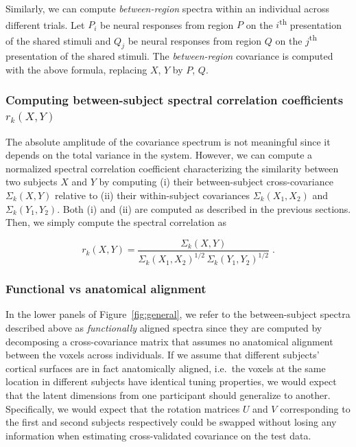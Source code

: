 \documentclass[10pt]{article}
\begin{document}
Similarly, we can compute \emph{between-region} spectra within an individual across different trials. Let \(P_i\) be neural responses from region \(P\) on the \(i\)\textsuperscript{th} presentation of the shared stimuli and \(Q_j\) be neural responses from region \(Q\) on the \(j\)\textsuperscript{th} presentation of the shared stimuli. The \emph{between-region} covariance is computed with the above formula, replacing \(X\), \(Y\) by \(P\), \(Q\).

\subsubsection{\texorpdfstring{Computing between-subject spectral correlation coefficients \(r_k(X, Y)\)}{Computing between-subject spectral correlation coefficients r\_k(X, Y)}}\label{computing-between-subject-spectral-correlation-coefficients-r_kx-y}

The absolute amplitude of the covariance spectrum is not meaningful since it depends on the total variance in the system. However, we can compute a normalized spectral correlation coefficient characterizing the similarity between two subjects \(X\) and \(Y\) by computing (i) their between-subject cross-covariance \(\Sigma_k(X, Y)\) relative to (ii) their within-subject covariances \(\Sigma_k(X_1, X_2)\) and \(\Sigma_k(Y_1, Y_2)\). Both (i) and (ii) are computed as described in the previous sections. Then, we simply compute the spectral correlation as

\[
    r_k(X, Y) = \frac{\Sigma_k(X, Y)}{\Sigma_k(X_1, X_2)^{1/2}\, \Sigma_k(Y_1, Y_2)^{1/2}}\;.
\]

\subsubsection{Functional vs anatomical alignment}\label{functional-vs-anatomical-alignment}

In the lower panels of Figure~\ref{fig:general}, we refer to the between-subject spectra described above as \emph{functionally} aligned spectra since they are computed by decomposing a cross-covariance matrix that assumes no anatomical alignment between the voxels across individuals. If we assume that different subjects' cortical surfaces are in fact anatomically aligned, i.e.~the voxels at the same location in different subjects have identical tuning properties, we would expect that the latent dimensions from one participant should generalize to another. Specifically, we would expect that the rotation matrices \(U\) and \(V\) corresponding to the first and second subjects respectively could be swapped without losing any information when estimating cross-validated covariance on the test data.
\end{document}
